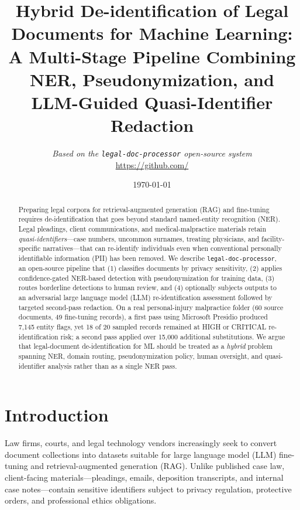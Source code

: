\documentclass[11pt,a4paper]{article}
\title{Hybrid De-identification of Legal Documents for Machine Learning:\\
A Multi-Stage Pipeline Combining NER, Pseudonymization, and LLM-Guided Quasi-Identifier Redaction}
\author{%
  \textit{Based on the \texttt{legal-doc-processor} open-source system}\\
  \url{https://github.com/} %
}
\date{\today}
\begin{document}
\maketitle

\begin{abstract}
Preparing legal corpora for retrieval-augmented generation (RAG) and fine-tuning requires de-identification that goes beyond standard named-entity recognition (NER). Legal pleadings, client communications, and medical-malpractice materials retain \emph{quasi-identifiers}---case numbers, uncommon surnames, treating physicians, and facility-specific narratives---that can re-identify individuals even when conventional personally identifiable information (PII) has been removed. We describe \texttt{legal-doc-processor}, an open-source pipeline that (1) classifies documents by privacy sensitivity, (2) applies confidence-gated NER-based detection with pseudonymization for training data, (3) routes borderline detections to human review, and (4) optionally subjects outputs to an adversarial large language model (LLM) re-identification assessment followed by targeted second-pass redaction. On a real personal-injury malpractice folder (60 source documents, 49 fine-tuning records), a first pass using Microsoft Presidio produced 7{,}145 entity flags, yet 18 of 20 sampled records remained at HIGH or CRITICAL re-identification risk; a second pass applied over 15{,}000 additional substitutions. We argue that legal-document de-identification for ML should be treated as a \emph{hybrid} problem spanning NER, domain routing, pseudonymization policy, human oversight, and quasi-identifier analysis rather than as a single NER pass.
\end{abstract}

\section{Introduction}

Law firms, courts, and legal technology vendors increasingly seek to convert document collections into datasets suitable for large language model (LLM) fine-tuning and retrieval-augmented generation (RAG). Unlike published case law, client-facing materials---pleadings, emails, deposition transcripts, and internal case notes---contain sensitive identifiers subject to privacy regulation, protective orders, and professional ethics obligations.
\end{document}
